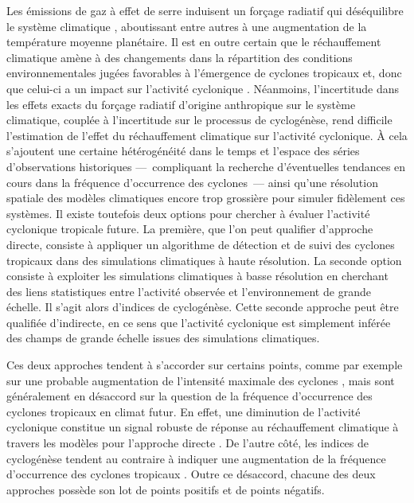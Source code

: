 \documentclass[../main.tex]{subfiles}
\begin{document}
Les émissions de gaz à effet de serre induisent un forçage radiatif qui déséquilibre le système climatique \parencite{charney_carbon_1979}, aboutissant entre
autres à une augmentation de la température moyenne planétaire. Il est en outre certain que le réchauffement climatique amène à des changements dans la
répartition des conditions environnementales jugées favorables à l'émergence de cyclones tropicaux et, donc que celui-ci a un impact sur l'activité cyclonique
\parencite{seneviratne_weather_2021}. Néanmoins, l'incertitude dans les effets exacts du forçage radiatif d'origine anthropique sur le système climatique,
couplée à l'incertitude sur le processus de cyclogénèse, rend difficile l'estimation de l'effet du réchauffement climatique sur l'activité cyclonique. À cela
s'ajoutent une certaine hétérogénéité dans le temps et l'espace des séries d'observations historiques ---~compliquant la recherche d'éventuelles tendances en
cours dans la fréquence d'occurrence des cyclones~--- ainsi qu'une résolution spatiale des modèles climatiques encore trop grossière pour simuler fidèlement ces
systèmes. Il existe toutefois deux options pour chercher à évaluer l'activité cyclonique tropicale future. La première, que l'on peut qualifier d'approche
directe, consiste à appliquer un algorithme de détection et de suivi des cyclones tropicaux dans des simulations climatiques à haute résolution. La seconde
option consiste à exploiter les simulations climatiques à basse résolution en cherchant des liens statistiques entre l'activité observée et l'environnement de
grande échelle. Il s'agit alors d'indices de cyclogénèse. Cette seconde approche peut être qualifiée d'indirecte, en ce sens que l'activité cyclonique est
simplement inférée des champs de grande échelle issues des simulations climatiques.

Ces deux approches tendent à s'accorder sur certains points, comme par exemple sur une probable augmentation de l'intensité maximale des cyclones
\parencite{sobel_human_2016,bhatia_projected_2018}, mais sont généralement en désaccord sur la question de la fréquence d'occurrence des cyclones tropicaux en
climat futur. En effet, une diminution de l'activité cyclonique constitue un signal robuste de réponse au réchauffement climatique à travers les modèles pour
l'approche directe \parencite{christensen_climate_2013,knutson_tropical_2020}. De l'autre côté, les indices de cyclogénèse tendent au contraire à indiquer une
augmentation de la fréquence d'occurrence des cyclones tropicaux \parencite{emanuel_downscaling_2013,camargo_testing_2014}. Outre ce désaccord, chacune des deux
approches possède son lot de points positifs et de points négatifs.
\end{document}
